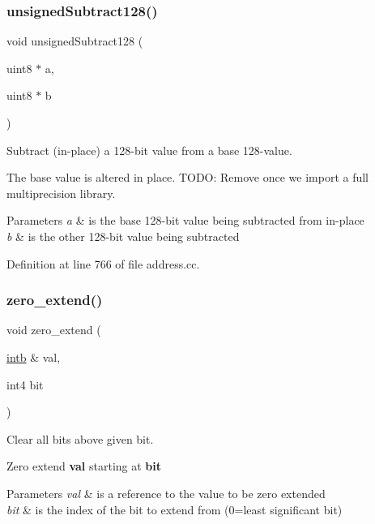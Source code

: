 \mbox{\label{address_8hh_a5cf8e9c3bc7603d16ba085596b113002}} 
\subsubsection{\texorpdfstring{unsignedSubtract128()}{unsignedSubtract128()}}
{\footnotesize\ttfamily void unsigned\+Subtract128 (\begin{DoxyParamCaption}\item[{uint8 $\ast$}]{a,  }\item[{uint8 $\ast$}]{b }\end{DoxyParamCaption})}



Subtract (in-\/place) a 128-\/bit value from a base 128-\/value. 

The base value is altered in place. T\+O\+DO\+: Remove once we import a full multiprecision library. 
\begin{DoxyParams}{Parameters}
{\em a} & is the base 128-\/bit value being subtracted from in-\/place \\
\hline
{\em b} & is the other 128-\/bit value being subtracted \\
\hline
\end{DoxyParams}


Definition at line 766 of file address.\+cc.

\mbox{\label{address_8hh_a953743448335ea450cbc58349ce1f0cf}} 
\subsubsection{\texorpdfstring{zero\_extend()}{zero\_extend()}}
{\footnotesize\ttfamily void zero\+\_\+extend (\begin{DoxyParamCaption}\item[{\mbox{\hyperlink{types_8h_aa925ba3e627c2df89d5b1cfe84fb8572}{intb}} \&}]{val,  }\item[{int4}]{bit }\end{DoxyParamCaption})}



Clear all bits above given bit. 

Zero extend {\bfseries{val}} starting at {\bfseries{bit}} 
\begin{DoxyParams}{Parameters}
{\em val} & is a reference to the value to be zero extended \\
\hline
{\em bit} & is the index of the bit to extend from (0=least significant bit) \\
\hline
\end{DoxyParams}


